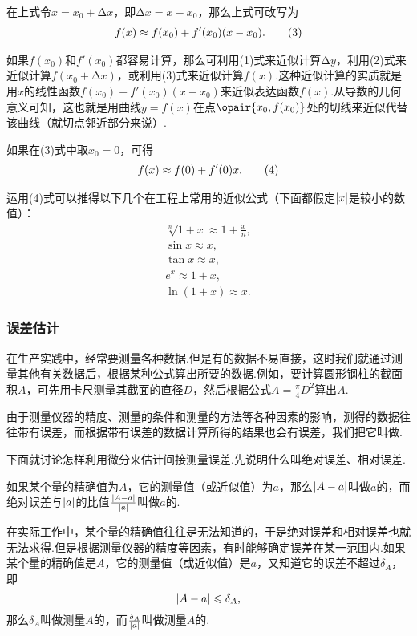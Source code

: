 在上式令\(x = x_0 + \increment x\)，即\(\increment x = x - x_0\)，那么上式可改写为\begin{gather}
f(x) \approx f(x_0) + f'(x_0) (x - x_0). \tag3
\end{gather}

如果\(f(x_0)\)和\(f'(x_0)\)都容易计算，那么可利用(1)式来近似计算\(\increment y\)，利用(2)式来近似计算\(f(x_0 + \increment x)\)，或利用(3)式来近似计算\(f(x)\).这种近似计算的实质就是用\(x\)的线性函数\(f(x_0) + f'(x_0) (x - x_0)\)来近似表达函数\(f(x)\).从导数的几何意义可知，这也就是用曲线\(y=f(x)\)在点\(\opair{x_0,f(x_0)}\)处的切线来近似代替该曲线（就切点邻近部分来说）.

如果在(3)式中取\(x_0 = 0\)，可得\begin{gather}
f(x) \approx f(0) + f'(0) x. \tag4
\end{gather}

运用(4)式可以推得以下几个在工程上常用的近似公式（下面都假定\(\abs{x}\)是较小的数值）：
\begin{gather}
\sqrt[n]{1+x} \approx 1 + \frac{x}{n}, \\
\sin x \approx x, \\
\tan x \approx x, \\
e^x \approx 1 + x, \\
\ln (1 + x) \approx x.
\end{gather}

\subsubsection{误差估计}
在生产实践中，经常要测量各种数据.但是有的数据不易直接，这时我们就通过测量其他有关数据后，根据某种公式算出所要的数据.例如，要计算圆形钢柱的截面积\(A\)，可先用卡尺测量其截面的直径\(D\)，然后根据公式\(A = \frac{\pi}{4} D^2\)算出\(A\).

由于测量仪器的精度、测量的条件和测量的方法等各种因素的影响，测得的数据往往带有误差，而根据带有误差的数据计算所得的结果也会有误差，我们把它叫做.

下面就讨论怎样利用微分来估计间接测量误差.先说明什么叫绝对误差、相对误差.

如果某个量的精确值为\(A\)，它的测量值（或近似值）为\(a\)，那么\(\abs{A-a}\)叫做\(a\)的，而绝对误差与\(\abs{a}\)的比值\(\frac{\abs{A-a}}{\abs{a}}\)叫做\(a\)的.

在实际工作中，某个量的精确值往往是无法知道的，于是绝对误差和相对误差也就无法求得.但是根据测量仪器的精度等因素，有时能够确定误差在某一范围内.如果某个量的精确值是\(A\)，它的测量值（或近似值）是\(a\)，又知道它的误差不超过\(\delta_A\)，即\[
\abs{A-a} \leqslant \delta_A,
\]那么\(\delta_A\)叫做测量\(A\)的，而\(\frac{\delta_A}{\abs{a}}\)叫做测量\(A\)的.

